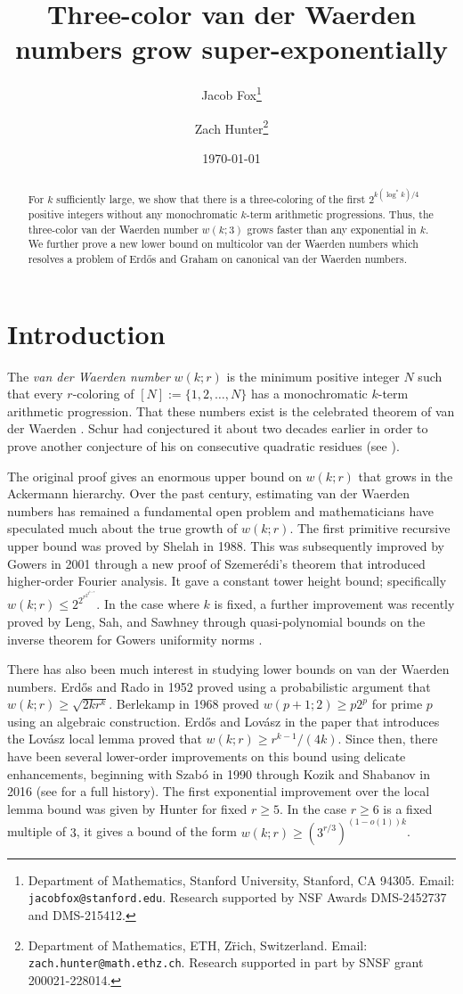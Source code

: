 \documentclass[11pt]{article}
\title{Three-color van der Waerden numbers grow super-exponentially}
\author{Jacob Fox\thanks{Department of Mathematics, Stanford University, Stanford, CA 94305. Email: {\tt jacobfox@stanford.edu}. Research supported by NSF Awards DMS-2452737 and DMS-215412.} 
\and Zach Hunter\thanks{Department of Mathematics, ETH, Z\"rich, Switzerland. Email: {\tt zach.hunter@math.ethz.ch}. Research supported in part by SNSF grant 200021-228014.}}
\date{\today}
\numberwithin{equation}{section}
\theoremstyle{definition}
\theoremstyle{remark}
\begin{document}
\maketitle

\begin{abstract}
For $k$ sufficiently large, we show that there is a three-coloring of the first $2^{k (\log^* k)/4}$ positive integers without any monochromatic $k$-term arithmetic progressions. Thus, the three-color van der Waerden number $w(k;3)$ grows faster than any exponential in $k$. We further prove a new lower bound on multicolor van der Waerden numbers which resolves a problem of Erd\H{o}s and Graham on canonical van der Waerden numbers. 


\end{abstract}
\section{Introduction}\label{sec:intro}

The {\it van der Waerden number} $w(k;r)$ is the minimum positive integer $N$ such that every $r$-coloring of $[N]:=\{1,2,\ldots,N\}$ has a monochromatic $k$-term arithmetic progression. That these numbers exist is the celebrated theorem of van der Waerden \cite{vanderWaerden}. Schur had conjectured it about two decades earlier in order to prove another conjecture of his on consecutive quadratic residues (see \cite{BR,Soifer}). 


The original proof gives an enormous upper bound on $w(k;r)$ that grows in the Ackermann hierarchy. Over the past century, estimating van der Waerden numbers has remained a fundamental open problem and mathematicians have speculated much about the true growth of $w(k;r)$. The first primitive recursive upper bound was proved by Shelah  \cite{Shelah} in 1988. This was subsequently improved by Gowers \cite{Gowers01} in 2001 through a new proof of Szemer\'edi's theorem that introduced higher-order Fourier analysis. It gave a constant tower height bound; specifically $w(k;r) \leq 2^{2^{r^{2^{2^{k+9}}}}}$. In the case where $k$ is fixed, a further improvement was recently proved by Leng, Sah, and Sawhney \cite{LSS} through quasi-polynomial bounds on the inverse theorem for Gowers uniformity norms \cite{LSS2}.


There has also been much interest in studying lower bounds on van der Waerden numbers. Erd\H{o}s and Rado \cite{ErRa52} in 1952 proved using a probabilistic argument that $w(k;r) \geq \sqrt{2kr^{k}}$. Berlekamp \cite{Berlekamp} in 1968 proved $w(p+1;2) \geq p2^p$ for prime $p$  using an algebraic construction. Erd\H{o}s and Lov\'asz \cite{erdos lovasz} in the paper that introduces the Lov\'asz local lemma proved that $w(k;r) \geq r^{k-1}/(4k)$. Since then, there have been several lower-order improvements on this bound using delicate enhancements, beginning with Szab\'o \cite{szabo} in 1990 through Kozik and Shabanov \cite{KS16} in 2016 (see \cite{KS16} for a full history). The first exponential improvement over the local lemma bound was given by Hunter \cite{Hunter} for fixed $r \geq 5$. In the case $r \geq 6$ is a fixed multiple of $3$, it gives a bound of the form $w(k;r) \geq (3^{r/3})^{(1-o(1))k}$. 
 
\end{document}
